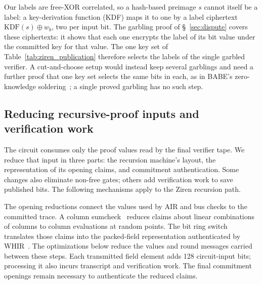 \documentclass[11pt]{article}
\begin{document}
Our labels are free-XOR correlated, so a hash-based preimage $s$ cannot itself
be a label: a key-derivation function (KDF) maps it to one by a label ciphertext $\mathrm{KDF}(s)\oplus w_b$, two per input bit.
The garbling proof of \S~\ref{sec:dispute} covers these ciphertexts: it shows
that each one encrypts the label of its bit value under the committed key
for that value. The one key set of Table~\ref{tab:ziren_publication}
therefore selects the labels of the single garbled verifier. A
cut-and-choose setup would instead keep several garblings and need a further
proof that one key set selects the same bits in each, as in BABE's
zero-knowledge soldering~\cite{babe2026}; a single proved garbling has no
such step.

\subsection{Reducing recursive-proof inputs and verification work}\label{sec:reduce}

The circuit consumes only the proof values read by the final verifier tape.
We reduce that input in three parts: the recursion machine's layout, the
representation of its opening claims, and commitment authentication. Some
changes also eliminate non-free gates; others add verification work to save
published bits. The following mechanisms apply to the Ziren recursion path.

The opening reductions connect the values used by AIR and bus checks to
the committed trace. A column sumcheck~\cite{lfkn92} reduces claims about
linear combinations of columns to column evaluations at random points.
The bit ring switch~\cite{dp24ringswitch} translates those claims into the
packed-field representation authenticated by WHIR~\cite{whir25}. The
optimizations below reduce the values and round messages carried between
these steps. Each transmitted field element adds 128 circuit-input bits;
processing it also incurs transcript and verification work. The final
commitment openings remain necessary to authenticate the reduced claims.
\end{document}
